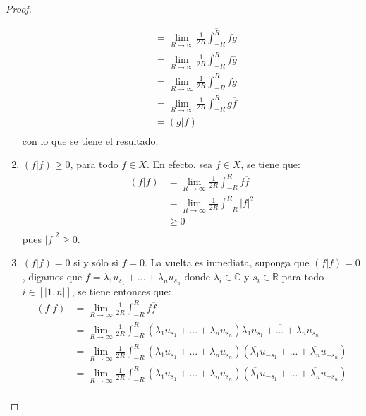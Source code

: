 \documentclass[12pt]{report}
\newcounter{it}
\theoremstyle{largebreak}
\newcommand\abs[1]{\ensuremath{\big|#1\big|}}
\newcommand\pint[2]{\ensuremath{\left(#1\big|#2\right)}}
\newcommand\conj[1]{\ensuremath{\overline{#1}}}
\begin{document}
\begin{proof}
\begin{enumerate}
\begin{equation*}
\begin{split}
                    &=\lim_{R\rightarrow\infty }\conj{\frac{1}{2R}\int_{-R}^{R}f\conj{g}} \\
                    &=\lim_{R\rightarrow\infty }\frac{1}{2R}\int_{-R}^{R}\conj{f\conj{g}} \\
                    &=\lim_{R\rightarrow\infty }\frac{1}{2R}\int_{-R}^{R}\conj{f}g \\
                    &=\lim_{R\rightarrow\infty }\frac{1}{2R}\int_{-R}^{R}g\conj{f} \\
                    &=\pint{g}{f}\\
                \end{split}
            \end{equation*}
            con lo que se tiene el resultado.
            \item $\pint{f}{f}\geq0$, para todo $f\in X$. En efecto, sea $f\in X$, se tiene que:
            \begin{equation*}
                \begin{split}
                    \pint{f}{f}&=\lim_{R\rightarrow\infty }\frac{1}{2R}\int_{-R}^{R}f\conj{f}\\
                    &=\lim_{R\rightarrow\infty }\frac{1}{2R}\int_{-R}^{R}\abs{f}^2 \\
                    &\geq0\\
                \end{split}
            \end{equation*}
            pues $\abs{f}^2\geq0$.
            \item $\pint{f}{f}=0$ si y sólo si $f=0$. La vuelta es inmediata, suponga que $\pint{f}{f}=0$, digamos que $f=\lambda_1 u_{s_1}+...+\lambda_nu_{s_n}$ donde $\lambda_i\in\mathbb{C}$ y $s_i\in\mathbb{R}$ para todo $i\in\left[|1,n|\right]$, se tiene entonces que:
            \begin{equation*}
                \begin{split}
                    \pint{f}{f}&= \lim_{R\rightarrow\infty }\frac{1}{2R}\int_{-R}^{R}f\conj{f}\\
                    &= \lim_{R\rightarrow\infty }\frac{1}{2R}\int_{-R}^{R}(\lambda_1 u_{s_1}+...+\lambda_nu_{s_n})\conj{\lambda_1 u_{s_1}+...+\lambda_nu_{s_n}}\\
                    &= \lim_{R\rightarrow\infty }\frac{1}{2R}\int_{-R}^{R}(\lambda_1 u_{s_1}+...+\lambda_nu_{s_n})(\conj{\lambda_1} u_{-s_1}+...+\conj{\lambda_n}u_{-s_n})\\
                    &= \lim_{R\rightarrow\infty }\frac{1}{2R}\int_{-R}^{R}(\lambda_1 u_{s_1}+...+\lambda_nu_{s_n})(\conj{\lambda_1} u_{-s_1}+...+\conj{\lambda_n}u_{-s_n})\\

\end{split}
\end{equation*}
\end{enumerate}
\end{proof}
\end{document}
